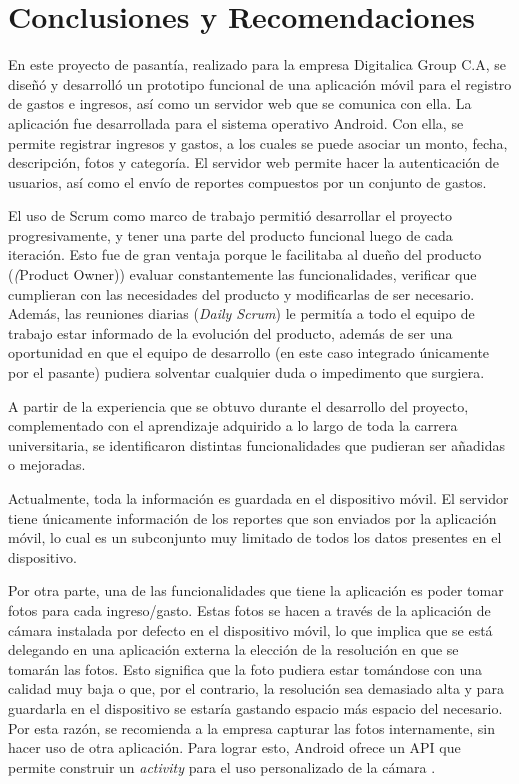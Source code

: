 \chapter{Conclusiones y Recomendaciones} \label{chap:conclusiones}

En este proyecto de pasantía, realizado para la empresa Digitalica Group C.A, se diseñó y desarrolló un prototipo funcional de una aplicación móvil para el registro de gastos e ingresos, así como un servidor web que se comunica con ella.  La aplicación fue desarrollada para el sistema operativo Android. Con ella, se permite registrar ingresos y gastos, a los cuales se puede asociar un monto, fecha, descripción, fotos y categoría. El servidor web permite hacer la autenticación de usuarios, así como el envío de reportes compuestos por un conjunto de gastos.

El uso de Scrum como marco de trabajo permitió desarrollar el proyecto progresivamente, y tener una parte del producto funcional luego de cada iteración. Esto fue de gran ventaja porque le facilitaba al dueño del producto (\textit(Product Owner)) evaluar constantemente las funcionalidades, verificar que cumplieran con las necesidades del producto y modificarlas de ser necesario. Además, las reuniones diarias (\textit{Daily Scrum}) le permitía a todo el equipo de trabajo estar informado de la evolución del producto, además de ser una oportunidad en que el equipo de desarrollo (en este caso integrado únicamente por el pasante) pudiera solventar cualquier duda o impedimento que surgiera.

A partir de la experiencia que se obtuvo durante el desarrollo del proyecto, complementado con el aprendizaje adquirido a lo largo de toda la carrera universitaria, se identificaron distintas funcionalidades que pudieran ser añadidas o mejoradas.

Actualmente, toda la información es guardada en el dispositivo móvil. El servidor tiene únicamente información de los reportes que son enviados por la aplicación móvil, lo cual es un subconjunto  muy limitado de todos los datos presentes en el dispositivo.

Por otra parte, una de las funcionalidades que tiene la aplicación es poder tomar fotos para cada ingreso/gasto. Estas fotos se hacen a través de la aplicación de cámara instalada por defecto en el dispositivo móvil, lo que implica que se está delegando en una aplicación externa la elección de la resolución en que se tomarán las fotos. Esto significa que la foto pudiera estar tomándose con una calidad muy baja o que, por el contrario, la resolución sea demasiado alta y para guardarla en el dispositivo se estaría gastando espacio más espacio del necesario. Por esta razón, se recomienda a la empresa capturar las fotos internamente, sin hacer uso de otra aplicación. Para lograr esto, Android ofrece un API que permite construir un \textit{activity} para el uso personalizado de la cámara \cite{AND4}.


